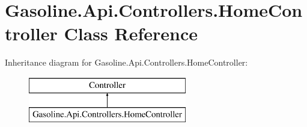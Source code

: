 \hypertarget{class_gasoline_1_1_api_1_1_controllers_1_1_home_controller}{}\section{Gasoline.\+Api.\+Controllers.\+Home\+Controller Class Reference}
\label{class_gasoline_1_1_api_1_1_controllers_1_1_home_controller}
Inheritance diagram for Gasoline.\+Api.\+Controllers.\+Home\+Controller\+:\begin{figure}[H]
\begin{center}
\leavevmode
\includegraphics[height=2.000000cm]{class_gasoline_1_1_api_1_1_controllers_1_1_home_controller}
\end{center}
\end{figure}

